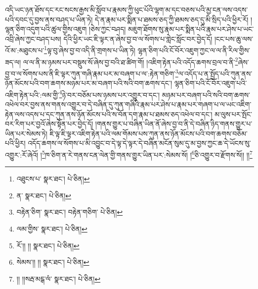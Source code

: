 འདི་ཡང་ཉན་ཐོས་དང་རང་སངས་རྒྱས་མི་སློབ་པ་རྣམས་ཀྱི་ཕུང་པོའི་ལྷག་མ་དང་བཅས་པའི་མྱ་ངན་ལས་འདས་པའི་དབང་དུ་བྱས་ནས་བཤད་པ་ཡིན་ཏེ། དེ་ན་རྣམ་པར་སྨིན་པ་ཐམས་ཅད་ཀྱི་ཐམས་ཅད་དུ་མི་སྲིད་པའི་ཕྱིར་རོ། །ལྷན་ཅིག་འདུག་པའི་ཚུལ་གྱིས་འཇུག །ཅེས་ཀྱང་བཤད། མཇུག་ཐོགས་སུ་རྣམ་པར་སྨིན་པའི་རྣམ་པར་ཤེས་པ་ཡང་འབྲི་ཞེས་ཀྱང་བཤད་པས། དེའི་ཕྱིར་ཡང་ཇི་ལྟར་ན་ཞེས་བྱ་བ་ལ་སོགས་པ་གླེང་སློང་བར་བྱེད་དོ། །ངང་པས་ཆུ་ལས་འོ་མ་:མཐུངས་པ་\footnote{འཐུངས་པ་  སྣར་ཐང་།  པེ་ཅིན། }ལྟ་བུ་ཞེས་བྱ་བ་འདི་ནི་གྲགས་པ་ཡིན་ཏེ། ལྷན་ཅིག་པའི་ངོ་བོར་འཇུག་ཀྱང་ལ་ལ་ནི་རིལ་གྱིས་ཟད་ལ། ལ་ལ་ནི་མ་ཉམས་པར་བསྡུས་སོ་ཞེས་བྱ་བའི་ཐ་ཚིག་གོ། །འཇིག་རྟེན་པའི་འདོད་ཆགས་བྲལ་བ་ནི་\footnote{ན་  སྣར་ཐང་།  པེ་ཅིན། }ཞེས་བྱ་བ་ལ་སོགས་པས་ནི་ཇི་ལྟར་ཀུན་གཞི་རྣམ་པར་མ་བཞག་པ་ལ་:རྟེན་གཅིག་\footnote{བརྟེན་ཅིག་  སྣར་ཐང་། བརྟེན་གཅིག་  པེ་ཅིན། }ལ་འདོད་པ་ན་སྤྱོད་པའི་ཀུན་ནས་ཉོན་མོངས་པའི་བག་ཆགས་མཉམ་པར་མ་བཞག་པའི་སའི་བག་ཆགས་དང་། ལྷན་ཅིག་པའི་ངོ་བོར་འཇུག་པའི་འཇིག་རྟེན་པའི་:ལམ་གྱི་\footnote{ལམ་གྱིས་  སྣར་ཐང་།  པེ་ཅིན། }ཉེ་བར་བཅོམ་པས་ཉམས་པར་འགྱུར་བ་དང་། མཉམ་པར་བཞག་པའི་སའི་བག་ཆགས་འཕེལ་བར་བྱས་ནས་གནས་འགྱུར་བ་དེ་བཞིན་དུ་ཀུན་གཞིའི་རྣམ་པར་ཤེས་པ་རྣམ་པར་གཞག་པ་ལ་ཡང་འཇིག་རྟེན་ལས་འདས་པ་དང་ཀུན་ནས་ཉོན་མོངས་པའི་ས་བོན་དག་རྣམ་པ་ཐམས་ཅད་འཕེལ་བ་དང་། མ་ལུས་པར་སྤོང་བར་རིག་པར་བྱའོ་ཞེས་སྟོན་པར་བྱེད་དོ། །གནས་གྱུར་པ་བཞིན་ཡིན་ནོ་ཞེས་བྱ་བ་ནི་དེ་བཞིན་ཉིད་གནས་གྱུར་པ་ཡིན་པར་སེམས་ཏེ། ཇི་ལྟ་ཇི་ལྟར་འཇིག་རྟེན་པའི་ལམ་གོམས་པས་ཀུན་ནས་ཉོན་མོངས་པའི་བག་ཆགས་བཅོམ་པའི་ཕྱིར། འདོད་ཆགས་ལ་སོགས་པ་མི་འབྱུང་བ་དེ་ལྟ་དེ་ལྟར་དེ་བཞིན་མངོན་སུམ་དུ་མ་བྱས་ཀྱང་ཆ་དེ་ཡོངས་སུ་འགྱུར་:རོ་ཞེའོ། །\footnote{རོ་།། །།  སྣར་ཐང་།  པེ་ཅིན། }ཁ་ཅིག་ན་རེ་གནས་ངན་ལེན་གྱི་གནས་གྱུར་ཡིན་པར་:སེམས་སོ། །\footnote{སེམས་།། །།  སྣར་ཐང་།  པེ་ཅིན། }ཅི་འགྱུར་བ་རྫོགས་སོ།། །།\footnote{།། །།སརྦ་མངྒ་ལཾ་  སྣར་ཐང་།  པེ་ཅིན། }